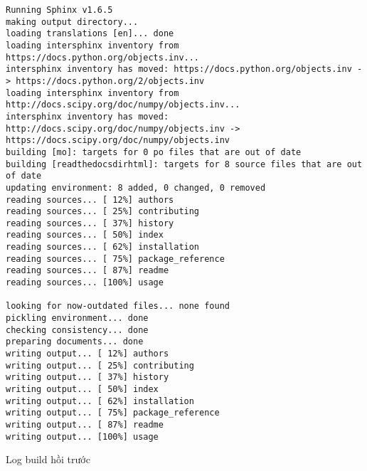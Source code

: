 \begin{lstlisting}
Running Sphinx v1.6.5
making output directory...
loading translations [en]... done
loading intersphinx inventory from https://docs.python.org/objects.inv...
intersphinx inventory has moved: https://docs.python.org/objects.inv -> https://docs.python.org/2/objects.inv
loading intersphinx inventory from http://docs.scipy.org/doc/numpy/objects.inv...
intersphinx inventory has moved: http://docs.scipy.org/doc/numpy/objects.inv -> https://docs.scipy.org/doc/numpy/objects.inv
building [mo]: targets for 0 po files that are out of date
building [readthedocsdirhtml]: targets for 8 source files that are out of date
updating environment: 8 added, 0 changed, 0 removed
reading sources... [ 12%] authors
reading sources... [ 25%] contributing
reading sources... [ 37%] history
reading sources... [ 50%] index
reading sources... [ 62%] installation
reading sources... [ 75%] package_reference
reading sources... [ 87%] readme
reading sources... [100%] usage

looking for now-outdated files... none found
pickling environment... done
checking consistency... done
preparing documents... done
writing output... [ 12%] authors
writing output... [ 25%] contributing
writing output... [ 37%] history
writing output... [ 50%] index
writing output... [ 62%] installation
writing output... [ 75%] package_reference
writing output... [ 87%] readme
writing output... [100%] usage
\end{lstlisting}

Log build hồi trước

